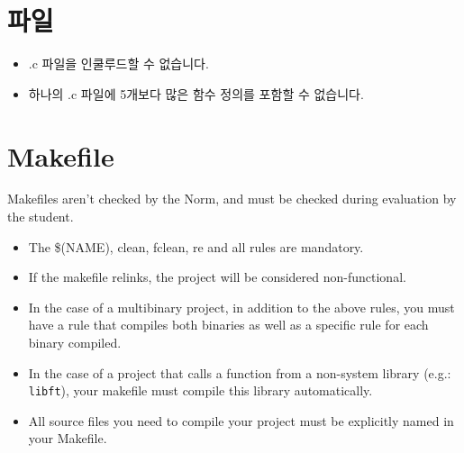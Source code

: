 \documentclass{42-ko}
\begin{document}
    \section{파일}

        \begin{itemize}

            \item .c 파일을 인쿨루드할 수 없습니다.

            \item 하나의 .c 파일에 5개보다 많은 함수 정의를 포함할 수 없습니다.

        \end{itemize}
        \newpage


    \section{Makefile}

            Makefiles aren't checked by the Norm, and must be checked during evaluation by 
            the student.
            \begin{itemize}

                \item The \$(NAME), clean, fclean, re and all
                  rules are mandatory.

                \item If the makefile relinks, the project will be considered
                  non-functional.

                \item In the case of a multibinary project, in addition to
                  the above rules, you must have a rule that compiles
                  both binaries as well as a specific rule for each
                  binary compiled.

                  \item In the case of a project that calls a function from a non-system library
                  (e.g.: \texttt{libft}), your makefile must compile
                  this library automatically.

                  \item All source files you need to compile your project must
                    be explicitly named in your Makefile.

            \end{itemize}
\end{document}
